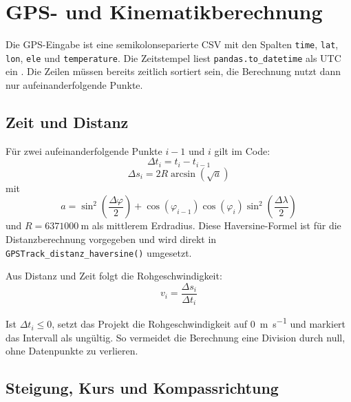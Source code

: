 \chapter{GPS- und Kinematikberechnung}
\label{ch:gps-kinematik}

Die GPS-Eingabe ist eine semikolonseparierte CSV mit den Spalten \texttt{time}, \texttt{lat}, \texttt{lon}, \texttt{ele} und \texttt{temperature}. Die Zeitstempel liest \texttt{pandas.to\_datetime} als UTC ein \cite{pandas_docs}. Die Zeilen müssen bereits zeitlich sortiert sein, die Berechnung nutzt dann nur aufeinanderfolgende Punkte.

\section{Zeit und Distanz}

Für zwei aufeinanderfolgende Punkte $i-1$ und $i$ gilt im Code:
\begin{equation}
\Delta t_i = t_i - t_{i-1}
\end{equation}
\begin{equation}
\Delta s_i = 2 R \arcsin\left(\sqrt{a}\right)
\end{equation}
mit
\begin{equation}
 a = \sin^2\!\left(\frac{\Delta \varphi}{2}\right) + \cos(\varphi_{i-1})\cos(\varphi_i)\sin^2\!\left(\frac{\Delta \lambda}{2}\right)
\end{equation}
und $R = \SI{6371000}{\metre}$ als mittlerem Erdradius. Diese Haversine-Formel ist für die Distanzberechnung vorgegeben und wird direkt in \texttt{GPSTrack\_distanz\_haversine()} umgesetzt.

Aus Distanz und Zeit folgt die Rohgeschwindigkeit:
\begin{equation}
 v_i = \frac{\Delta s_i}{\Delta t_i}
\end{equation}

Ist \(\Delta t_i \le 0\), setzt das Projekt die Rohgeschwindigkeit auf \SI{0}{\metre\per\second} und markiert das Intervall als ungültig. So vermeidet die Berechnung eine Division durch null, ohne Datenpunkte zu verlieren.

\section{Steigung, Kurs und Kompassrichtung}

